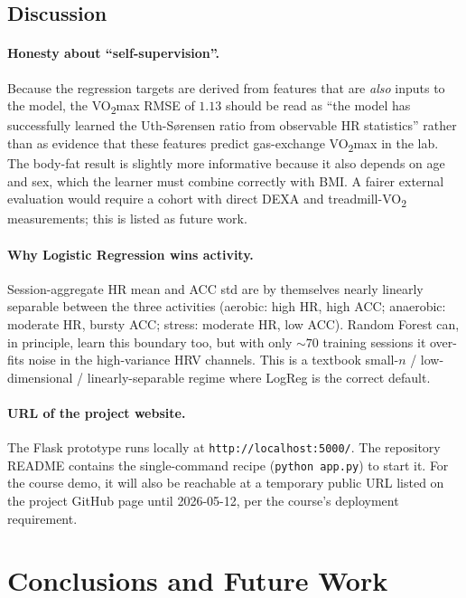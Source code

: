 \documentclass[sigconf,nonacm]{acmart}
\begin{document}
\subsection{Discussion}
\label{sec:discussion}
\paragraph{Honesty about ``self-supervision''.}
Because the regression targets are derived from features that are
\emph{also} inputs to the model, the VO\textsubscript{2}max RMSE of
$1.13$ should be read as ``the model has successfully learned the
Uth-S{\o}rensen ratio from observable HR statistics'' rather than as
evidence that these features predict gas-exchange
VO\textsubscript{2}max in the lab. The body-fat result is slightly
more informative because it also depends on age and sex, which the
learner must combine correctly with BMI. A fairer external evaluation
would require a cohort with direct DEXA and treadmill-VO\textsubscript{2}
measurements; this is listed as future work.

\paragraph{Why Logistic Regression wins activity.}
Session-aggregate HR mean and ACC std are by themselves nearly linearly
separable between the three activities (aerobic: high HR, high ACC;
anaerobic: moderate HR, bursty ACC; stress: moderate HR, low ACC).
Random Forest can, in principle, learn this boundary too, but with
only $\sim 70$ training sessions it over-fits noise in the high-variance
HRV channels. This is a textbook small-$n$ / low-dimensional /
linearly-separable regime where LogReg is the correct default.

\paragraph{URL of the project website.}
The Flask prototype runs locally at
\texttt{http://localhost:5000/}. The repository README contains the
single-command recipe (\texttt{python app.py}) to start it. For the
course demo, it will also be reachable at a temporary public URL
listed on the project GitHub page until 2026-05-12, per the course's
deployment requirement.

\section{Conclusions and Future Work}
\end{document}
